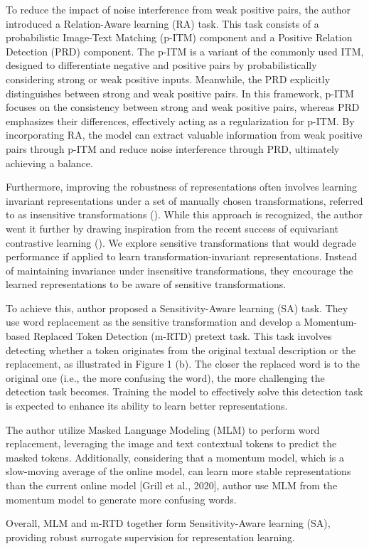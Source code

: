 To reduce the impact of noise interference from weak positive pairs, the author introduced a Relation-Aware learning (RA) task. This task consists of a probabilistic Image-Text Matching (p-ITM) component and a Positive Relation Detection (PRD) component. The p-ITM is a variant of the commonly used ITM, designed to differentiate negative and positive pairs by probabilistically considering strong or weak positive inputs. Meanwhile, the PRD explicitly distinguishes between strong and weak positive pairs. In this framework, p-ITM focuses on the consistency between strong and weak positive pairs, whereas PRD emphasizes their differences, effectively acting as a regularization for p-ITM. By incorporating RA, the model can extract valuable information from weak positive pairs through p-ITM and reduce noise interference through PRD, ultimately achieving a balance.

Furthermore, improving the robustness of representations often involves learning invariant representations under a set of manually chosen transformations, referred to as insensitive transformations (\cite{caron2021unsupervisedlearningvisualfeatures}). While this approach is recognized, the author went it further by drawing inspiration from the recent success of equivariant contrastive learning (\cite{dangovski2022equivariantcontrastivelearning}). We explore sensitive transformations that would degrade performance if applied to learn transformation-invariant representations. Instead of maintaining invariance under insensitive transformations, they encourage the learned representations to be aware of sensitive transformations. 

To achieve this, author proposed a Sensitivity-Aware learning (SA) task. They use word replacement as the sensitive transformation and develop a Momentum-based Replaced Token Detection (m-RTD) pretext task. This task involves detecting whether a token originates from the original textual description or the replacement, as illustrated in Figure 1 (b). The closer the replaced word is to the original one (i.e., the more confusing the word), the more challenging the detection task becomes. Training the model to effectively solve this detection task is expected to enhance its ability to learn better representations.

The author utilize Masked Language Modeling (MLM) to perform word replacement, leveraging the image and text contextual tokens to predict the masked tokens. Additionally, considering that a momentum model, which is a slow-moving average of the online model, can learn more stable representations than the current online model [Grill et al., 2020], author use MLM from the momentum model to generate more confusing words. 

Overall, MLM and m-RTD together form Sensitivity-Aware learning (SA), providing robust surrogate supervision for representation learning.



